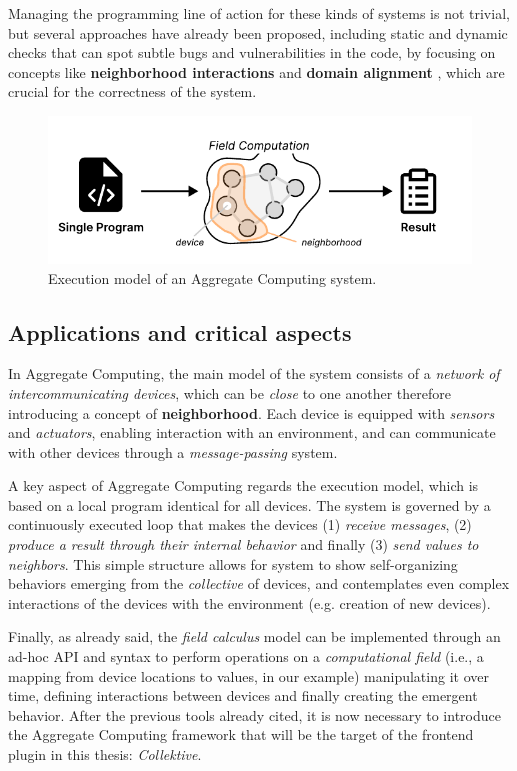 \documentclass[12pt,a4paper,openright,twoside]{book}
\begin{document}
Managing the programming line of action for these kinds of systems is not
trivial, but several approaches have already been proposed, including static and
dynamic checks that can spot subtle bugs and vulnerabilities in the code, by
focusing on concepts like \textbf{neighborhood interactions} and \textbf{domain
alignment} \cite{DBLP:conf/saso/AudritoDVC16}, which are crucial for the
correctness of the system.

\begin{figure}
  \centering
  \includegraphics[width=.9\linewidth]{figures/field-computation.pdf}
  \caption{Execution model of an Aggregate Computing system.}
  \label{fig:field-computation}
\end{figure}

\subsection{Applications and critical aspects}

In Aggregate Computing, the main model of the system consists of a \emph{network of 
intercommunicating devices}, which can be \emph{close} to one another therefore 
introducing a concept of \textbf{neighborhood}. 
%
Each device is equipped with \emph{sensors} and \emph{actuators}, enabling
interaction with an environment, and can communicate with other devices through
a \emph{message-passing} system. 

A key aspect of Aggregate Computing regards the execution model, which is based
on a local program identical for all devices. The system is governed by a
continuously executed loop that makes the devices (1) \emph{receive messages},
(2) \emph{produce a result through their internal behavior} and finally (3)
\emph{send values to neighbors}. 
%
This simple structure allows for system to show self-organizing behaviors
emerging from the \emph{collective} of devices, and contemplates even complex
interactions of the devices with the environment (e.g. creation of new devices).

Finally, as already said, the \emph{field calculus} model can be implemented
through an ad-hoc API and syntax to perform operations on a \emph{computational
field} (i.e., a mapping from device locations to values, in our example)
manipulating it over time, defining interactions between devices and finally
creating the emergent behavior.
%
After the previous tools already cited, it is now necessary to
introduce the Aggregate Computing framework that will be the target of the
frontend plugin in this thesis: \emph{Collektive}.
\end{document}
